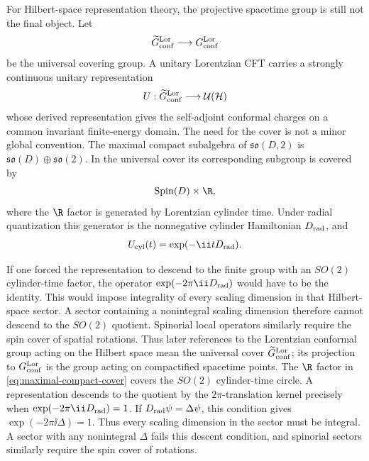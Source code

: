 \begin{definition}
\label{def:hilbert-space-conformal-group}
For Hilbert-space representation theory, the projective spacetime group is
still not the final object.  Let
\begin{equation}
  \widetilde G_{\rm conf}^{\rm Lor}
  \longrightarrow
  G_{\rm conf}^{\rm Lor}
  \label{eq:lorentzian-conformal-universal-cover}
\end{equation}
be the universal covering group.  A unitary Lorentzian CFT carries a
strongly continuous unitary representation
\[
  U:\widetilde G_{\rm conf}^{\rm Lor}\longrightarrow
  \mathcal U(\mathcal H)
\]
whose derived representation gives the self-adjoint conformal charges on a
common invariant finite-energy domain.  The need for the cover is not a
minor global convention.  The maximal compact subalgebra of
\(\mathfrak{so}(D,2)\) is
\(\mathfrak{so}(D)\oplus\mathfrak{so}(2)\).  In the universal cover its
corresponding subgroup is covered by
\begin{equation}
  \operatorname{Spin}(D)\times \R ,
  \label{eq:maximal-compact-cover}
\end{equation}
where the \(\R\) factor is generated by Lorentzian cylinder time.  Under
radial quantization this generator is the nonnegative cylinder Hamiltonian
\(D_{\rm rad}\), and
\begin{equation}
  U_{\rm cyl}(t)=\exp(-\ii t D_{\rm rad}).
  \label{eq:cylinder-time-unitary-cover}
\end{equation}
\end{definition}

If one forced the representation to descend to the finite group with an
\(SO(2)\) cylinder-time factor, the operator
\(\exp(-2\pi\ii D_{\rm rad})\) would have to be the identity.  This would
impose integrality of every scaling dimension in that Hilbert-space sector.
A sector containing a nonintegral scaling dimension therefore cannot descend
to the \(SO(2)\) quotient.  Spinorial local operators similarly require the
spin cover of spatial rotations.  Thus later references to the Lorentzian
conformal group acting on the Hilbert space mean the universal cover
\(\widetilde G_{\rm conf}^{\rm Lor}\); its projection to
\(G_{\rm conf}^{\rm Lor}\) is the group acting on compactified spacetime
points.
The \(\R\) factor in \eqref{eq:maximal-compact-cover} covers the
\(SO(2)\) cylinder-time circle.  A representation descends to the quotient by
the \(2\pi\)-translation kernel precisely when
\(\exp(-2\pi\ii D_{\rm rad})=1\).  If
\(D_{\rm rad}\psi=\Delta\psi\), this condition gives
\(\exp(-2\pi\ii\Delta)=1\).  Thus every scaling dimension in the sector must
be integral.  A sector with any nonintegral \(\Delta\) fails this descent
condition, and spinorial sectors similarly require the spin cover of rotations.


